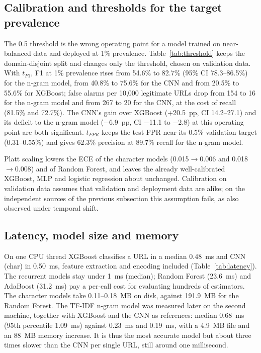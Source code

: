 \documentclass[conference]{IEEEtran}
\begin{document}


\subsection{Calibration and thresholds for the target prevalence}

The 0.5 threshold is the wrong operating point for a model trained on near-balanced data and deployed at 1\% prevalence. Table~\ref{tab:threshold} keeps the domain-disjoint split and changes only the threshold, chosen on validation data. With $t_{F1}$, F1 at 1\% prevalence rises from 54.6\% to 82.7\% (95\% CI 78.3--86.5\%) for the n-gram model, from 40.8\% to 75.6\% for the CNN and from 20.5\% to 55.6\% for XGBoost; false alarms per 10,000 legitimate URLs drop from 154 to 16 for the n-gram model and from 267 to 20 for the CNN, at the cost of recall (81.5\% and 72.7\%). The CNN's gain over XGBoost (+20.5~pp, CI 14.2--27.1) and its deficit to the n-gram model ($-$6.9~pp, CI $-$11.1 to $-$2.8) at this operating point are both significant. $t_{FPR}$ keeps the test FPR near its 0.5\% validation target (0.31--0.55\%) and gives 62.3\% precision at 89.7\% recall for the n-gram model.

Platt scaling lowers the ECE of the character models (0.015$\to$0.006 and 0.018$\to$0.008) and of Random Forest, and leaves the already well-calibrated XGBoost, MLP and logistic regression about unchanged. Calibration on validation data assumes that validation and deployment data are alike; on the independent sources of the previous subsection this assumption fails, as \cite{glazyrina2026} also observed under temporal shift.



\subsection{Latency, model size and memory}

On one CPU thread XGBoost classifies a URL in a median 0.48~ms and CNN (char) in 0.50~ms, feature extraction and encoding included (Table~\ref{tab:latency}). The recurrent models stay under 1~ms (median); Random Forest (23.6~ms) and AdaBoost (31.2~ms) pay a per-call cost for evaluating hundreds of estimators. The character models take 0.11--0.18~MB on disk, against 191.9~MB for the Random Forest. The TF-IDF n-gram model was measured later on the second machine, together with XGBoost and the CNN as references: median 0.68~ms (95th percentile 1.09~ms) against 0.23~ms and 0.19~ms, with a 4.9~MB file and an 88~MB memory increase. It is thus the most accurate model but about three times slower than the CNN per single URL, still around one millisecond.
\end{document}

